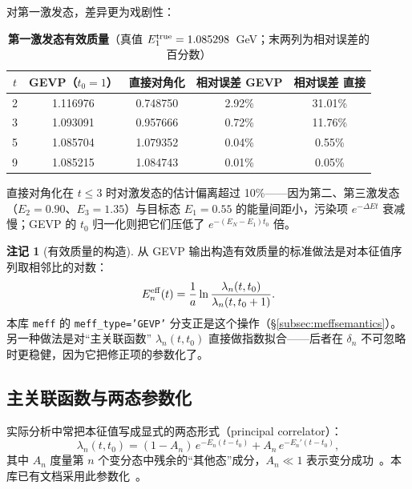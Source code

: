 \documentclass[12pt,a4paper]{ctexart}
\theoremstyle{definition}
\newtheorem{remark}{注记}[section]
\newcommand{\code}[1]{\texttt{#1}}
\begin{document}
对第一激发态，差异更为戏剧性：

\begin{table}[htbp]
\centering
\caption{\textbf{第一激发态有效质量}（真值 $E_1^{\rm true}=1.085298$~GeV；末两列为相对误差的百分数）}
\label{tab:exc}
\begin{tabular}{ccccc}
\toprule
$t$ & GEVP（$t_0=1$） & 直接对角化 & 相对误差 GEVP & 相对误差 直接 \\
\midrule
2 & 1.116976 & 0.748750 & 2.92\% & 31.01\% \\
3 & 1.093091 & 0.957666 & 0.72\% & 11.76\% \\
5 & 1.085704 & 1.079352 & 0.04\% & 0.55\% \\
9 & 1.085215 & 1.084743 & 0.01\% & 0.05\% \\
\bottomrule
\end{tabular}
\end{table}

直接对角化在 $t\le3$ 时对激发态的估计偏离超过 10\%——因为第二、第三激发态（$E_2=0.90$、$E_3=1.35$）与目标态 $E_1=0.55$ 的能量间距小，污染项 $e^{-\Delta E t}$ 衰减慢；GEVP 的 $t_0$ 归一化则把它们压低了 $e^{-(E_N-E_1)t_0}$ 倍。

\begin{remark}[有效质量的构造]\label{rem:effmass}
从 GEVP 输出构造有效质量的标准做法是对本征值序列取相邻比的对数：
\begin{equation}
E_n^{\rm eff}(t) = \frac{1}{a}\ln\frac{\lambda_n(t,t_0)}{\lambda_n(t,t_0+1)} .
\label{eq:effmass}
\end{equation}
本库 \code{meff} 的 \code{meff\_type='GEVP'} 分支正是这个操作（§\ref{subsec:meffsemantics}）。另一种做法是对``主关联函数'' $\lambda_n(t,t_0)$ 直接做指数拟合——后者在 $\delta_n$ 不可忽略时更稳健，因为它把修正项的参数化了。
\end{remark}

\subsection{主关联函数与两态参数化}

实际分析中常把本征值写成显式的两态形式（principal correlator）：
\begin{equation}
\lambda_n(t,t_0) = (1-A_n)\, e^{-E_n(t-t_0)} + A_n\, e^{-E_n'(t-t_0)} ,
\label{eq:principal}
\end{equation}
其中 $A_n$ 度量第 $n$ 个变分态中残余的``其他态''成分，$A_n\ll1$ 表示变分成功~\cite{correlationFunctions2026}。本库已有文档采用此参数化~\cite{correlationFunctions2026,threepoint2026}。
\end{document}
